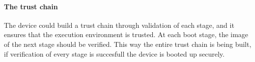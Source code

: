 \documentclass{article}
\begin{document}
\paragraph{The trust chain}

The device could build a trust chain through validation of each stage, and it ensures that the execution environment is trusted. At each boot stage, the image of the next stage should be verified. This way the entire trust chain is being built, if verification of every stage is succesfull the device is booted up securely.
\end{document}

